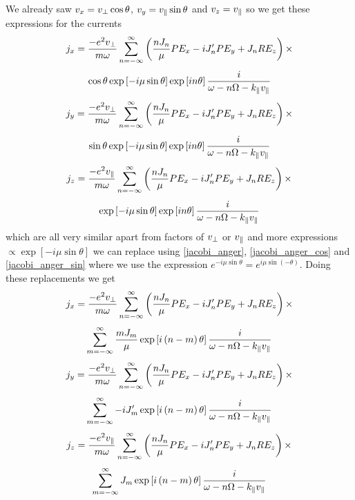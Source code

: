 We already saw $v_x = v_\perp \cos\theta$, $v_y = v_\parallel \sin\theta$ and $v_z = v_\parallel$ so we get these expressions for the currents
\begin{equation*}
	j_x = \frac{-e^2v_\perp}{m \omega} \sum_{n=-\infty}^\infty \left(\frac{nJ_n}{\mu} P E_x - i J_n' P E_y + J_n R E_z \right) \times
\end{equation*}
\begin{equation}
	\cos\theta \exp \left[-i\mu \sin\theta \right] \exp \left[in \theta \right] \frac{i}{\omega-n\Omega-k_\parallel v_\parallel}
\end{equation}
\begin{equation*}
	j_y = \frac{-e^2v_\perp}{m \omega} \sum_{n=-\infty}^\infty \left(\frac{nJ_n}{\mu} P E_x - i J_n' P E_y + J_n R E_z \right) \times
\end{equation*}
\begin{equation}
	\sin\theta \exp \left[-i\mu \sin\theta \right] \exp \left[in \theta \right] \frac{i}{\omega-n\Omega-k_\parallel v_\parallel}
\end{equation}
\begin{equation*}
	j_z = \frac{-e^2v_\parallel}{m \omega} \sum_{n=-\infty}^\infty \left(\frac{nJ_n}{\mu} P E_x - i J_n' P E_y + J_n R E_z \right) \times
\end{equation*}
\begin{equation}
	\exp \left[-i\mu \sin\theta \right] \exp \left[in \theta \right] \frac{i}{\omega-n\Omega-k_\parallel v_\parallel}
\end{equation}
which are all very similar apart from factors of $v_\perp$ or $v_\parallel$ and more expressions $\propto \exp \left[-i\mu \sin\theta \right]$ we can replace using \eqref{jacobi_anger}, \eqref{jacobi_anger_cos} and \eqref{jacobi_anger_sin} where we use the expression $e^{-i\mu\sin\theta} = e^{i\mu\sin\left(-\theta\right)}$. Doing these replacements we get
\begin{equation*}
	j_x = \frac{-e^2v_\perp}{m \omega} \sum_{n=-\infty}^\infty \left(\frac{nJ_n}{\mu} P E_x - i J_n' P E_y + J_n R E_z \right) \times
\end{equation*}
\begin{equation}
	\sum_{m=-\infty}^\infty \frac{mJ_m}{\mu} \exp \left[i\left(n - m\right) \theta \right] \frac{i}{\omega-n\Omega-k_\parallel v_\parallel}
\end{equation}
\begin{equation*}
	j_y = \frac{-e^2v_\perp}{m \omega} \sum_{n=-\infty}^\infty \left(\frac{nJ_n}{\mu} P E_x - i J_n' P E_y + J_n R E_z \right) \times
\end{equation*}
\begin{equation}
	\sum_{m=-\infty}^\infty -iJ_m' \exp \left[i\left(n - m\right) \theta \right] \frac{i}{\omega-n\Omega-k_\parallel v_\parallel}
\end{equation}
\begin{equation*}
	j_z = \frac{-e^2v_\parallel}{m \omega} \sum_{n=-\infty}^\infty \left(\frac{nJ_n}{\mu} P E_x - i J_n' P E_y + J_n R E_z \right) \times
\end{equation*}
\begin{equation}
	\sum_{m=-\infty}^\infty J_m \exp \left[i\left(n - m\right) \theta \right] \frac{i}{\omega-n\Omega-k_\parallel v_\parallel}
\end{equation}

